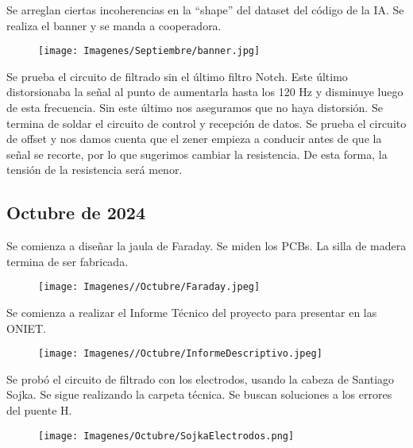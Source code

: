 \documentclass{article}
\begin{document}
\newpage
Se arreglan ciertas incoherencias en la “shape” del dataset del código de la IA. Se realiza el banner y se manda a cooperadora.

\begin{figure}[H]
    \centering
    \texttt{[image: Imagenes/Septiembre/banner.jpg]}
\end{figure}

Se prueba el circuito de filtrado sin el último filtro Notch. Este último distorsionaba la señal al punto de aumentarla hasta los 120 Hz y disminuye luego de esta frecuencia. Sin este último nos aseguramos que no haya distorsión. Se termina de soldar el circuito de control y recepción de datos. Se prueba el circuito de offset y nos damos cuenta que el zener empieza a conducir antes de que la señal se recorte, por lo que sugerimos cambiar la resistencia. De esta forma, la tensión de la resistencia será menor.

\newpage

\begin{center}
    \section{Octubre de 2024}
\end{center}

Se comienza a diseñar la jaula de Faraday. Se miden los PCBs. La silla de madera termina de ser fabricada.

\begin{figure}[H]
    \centering
    \texttt{[image: Imagenes//Octubre/Faraday.jpeg]}
\end{figure}

Se comienza a realizar el Informe Técnico del proyecto para presentar en las ONIET.

\begin{figure}[H]
    \centering
    \texttt{[image: Imagenes//Octubre/InformeDescriptivo.jpeg]}
\end{figure}

\newpage

Se probó el circuito de filtrado con los electrodos, usando la cabeza de Santiago Sojka. Se sigue realizando la carpeta técnica. Se buscan soluciones a los errores del puente H.

\begin{figure}[H]
    \centering
    \texttt{[image: Imagenes/Octubre/SojkaElectrodos.png]}
\end{figure}
\end{document}
